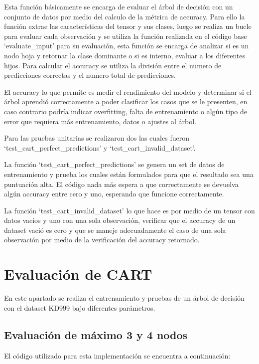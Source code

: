 \documentclass[12pt,a4paper]{article}
\begin{document}
Esta función básicamente se encarga de evaluar el árbol de decisión con un conjunto de datos por medio del calculo de la métrica
de accuracy. Para ello la función extrae las características del tensor y sus clases, luego se realiza un bucle para evaluar cada observación
y se utiliza la función realizada en el código base `evaluate_input' para su evaluación, esta función se encarga de
analizar si es un nodo hoja y retornar la clase dominante o si es interno, evaluar a los diferentes hijos.
Para calcular el accuracy se utiliza la división entre el numero de predicciones correctas y el numero total de predicciones.

El accuracy lo que permite es medir el rendimiento del modelo y determinar si el árbol aprendió correctamente a poder clasificar
los casos que se le presenten, en caso contrario podría indicar overfitting, falta de entrenamiento o algún tipo de error que requiera
más entrenamiento, datos o ajustes al árbol.

Para las pruebas unitarias se realizaron dos las cuales fueron `test_cart_perfect_predictions' y `test_cart_invalid_dataset'.

La función `test_cart_perfect_predictions' se genera un set de datos de entrenamiento y prueba los cuales están formulados para que el resultado
sea una puntuación alta. El código nada más espera a que correctamente se devuelva algún accuracy entre cero y uno, esperando que
funcione correctamente.

La función `test_cart_invalid_dataset' lo que hace es por medio de un tensor con datos vacíos y uno con una sola observación,
verificar que el accuracy de un dataset vació es cero y que se maneje adecuadamente el caso de una sola observación por medio
de la verificación del accuracy retornado.

\section{Evaluación de CART}\label{sec:evaluacion-de-cart}

En este apartado se realiza el entrenamiento y pruebas de un árbol de decisión con el dataset KD999 bajo diferentes parámetros.

\subsection{Evaluación de máximo 3 y 4 nodos}\label{subsec:evaluacion-de-maximo-3-y-4-nodos}

El código utilizado para esta implementación se encuentra a continuación:
\end{document}

